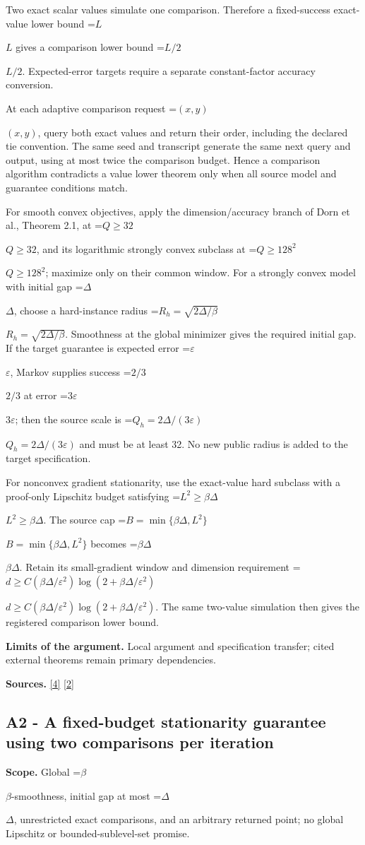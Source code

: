 \documentclass[10pt,a4paper]{article}
\newcommand{\AtlasMath}[1]{\par\begingroup\centering\setbox0=\hbox{$\displaystyle #1$}\ifdim\wd0>1.4\linewidth\typeout{ATLAS WIDE FORMULA: \the\wd0}\fi\ifdim\wd0>\linewidth\resizebox{\linewidth}{!}{\box0}\else\box0\fi\par\endgroup}
\newcommand{\AtlasInlineMath}[1]{\begingroup\setbox0=\hbox{$#1$}\ifdim\wd0>.4\linewidth\endgroup\AtlasMath{#1}\else\endgroup$#1$\fi}
\begin{document}
Two exact scalar values simulate one comparison. Therefore a fixed-success exact-value lower bound \AtlasInlineMath{L} gives a comparison lower bound \AtlasInlineMath{L/2}. Expected-error targets require a separate constant-factor accuracy conversion.

At each adaptive comparison request \AtlasInlineMath{(x,y)}, query both exact values and return their order, including the declared tie convention. The same seed and transcript generate the same next query and output, using at most twice the comparison budget. Hence a comparison algorithm contradicts a value lower theorem only when all source model and guarantee conditions match.

For smooth convex objectives, apply the dimension/accuracy branch of Dorn et al., Theorem 2.1, at \AtlasInlineMath{Q\ge32}, and its logarithmic strongly convex subclass at \AtlasInlineMath{Q\ge128^2}; maximize only on their common window. For a strongly convex model with initial gap \AtlasInlineMath{\Delta}, choose a hard-instance radius \AtlasInlineMath{R_h=\sqrt{2\Delta/\beta}}. Smoothness at the global minimizer gives the required initial gap. If the target guarantee is expected error \AtlasInlineMath{\varepsilon}, Markov supplies success \AtlasInlineMath{2/3} at error \AtlasInlineMath{3\varepsilon}; then the source scale is \AtlasInlineMath{Q_h=2\Delta/(3\varepsilon)} and must be at least 32. No new public radius is added to the target specification.

For nonconvex gradient stationarity, use the exact-value hard subclass with a proof-only Lipschitz budget satisfying \AtlasInlineMath{L^2\ge\beta\Delta}. The source cap \AtlasInlineMath{B=\min\{\beta\Delta,L^2\}} becomes \AtlasInlineMath{\beta\Delta}. Retain its small-gradient window and dimension requirement \AtlasInlineMath{d\ge C(\beta\Delta/\varepsilon^2)\log(2+\beta\Delta/\varepsilon^2)}. The same two-value simulation then gives the registered comparison lower bound.

\textbf{Limits of the argument.} Local argument and specification transfer; cited external theorems remain primary dependencies.

\textbf{Sources.} \href{https://arxiv.org/html/2610.00345v1}{[4]} \href{https://arxiv.org/html/2610.19652v1}{[2]}

\subsection{A2 - A fixed-budget stationarity guarantee using two comparisons per iteration}
\textbf{Scope.} Global \AtlasInlineMath{\beta}-smoothness, initial gap at most \AtlasInlineMath{\Delta}, unrestricted exact comparisons, and an arbitrary returned point; no global Lipschitz or bounded-sublevel-set promise.
\end{document}

